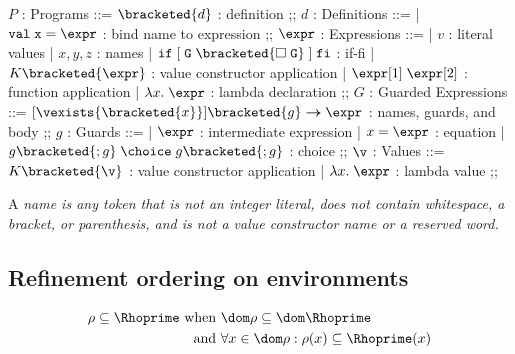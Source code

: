 \documentclass[manuscript,screen,review, 12pt, nonacm]{acmart}
\begin{document}
\begin{center}
    \begin{bnf}
    $P$ : \textsf{Programs} ::=
    $\bracketed{d}$ : definition
    ;;
    $d$ : \textsf{Definitions} ::=
    | $\tt{val}\; x\; \tt{=}\; \expr$ : bind name to expression
    ;;
    $\expr$ : \textsf{Expressions} ::=
    | $v$ : literal values 
    | $x, y, z$ : names
    | $\tt{if}\; \tt{[}\; G\; \bracketed{\square\; G}\; \tt{]}\; \tt{fi}$ : if-fi 
    | $K \bracketed{\expr}$ : value constructor application 
    | $\expr[1]\; \expr[2]$ : function application 
    | $\lambda x.\; \expr$ : lambda declaration 
    ;;
    $G$ : \textsf{Guarded Expressions} ::=  
    $[\vexists{\bracketed{x}}] \bracketed{g} \boldsymbol{\rightarrow}\expr$ : names, guards, and body
    ;;
    $g$ : \textsf{Guards} ::=  
    | $\expr$ : intermediate expression 
    | $x = \expr$ : equation 
    | $ g \bracketed{; g} \; \choice \; g \bracketed{; g}$ : choice 
    ;;
    $\v$ : Values ::= $K\bracketed{\v}$ : value constructor application 
    | $\lambda x.\; \expr$ : lambda value
    ;;
    \end{bnf}
\end{center}

A \it{name} is any token that is not an integer literal, 
does not contain whitespace, a bracket, or parenthesis, 
and is not a value constructor name or a reserved word.
        
\subsection{Refinement ordering on environments}

\begin{align*}
\rho \subseteq \Rhoprime \text{ when }&\dom\rho  \subseteq \dom \Rhoprime\\
\text{ and } &\forall x \in \dom \rho: \rho(x) \subseteq \Rhoprime(x)
\end{align*}



\vfilbreak
\end{document}
